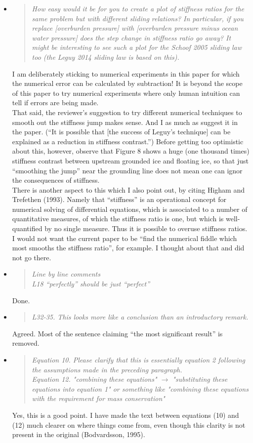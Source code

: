 \documentclass[11pt,reqno]{amsart}
\newcommand{\reply}[2]{
\medskip\medskip
\item  \begin{quote}
\emph{#1}
\end{quote}

\medskip
\noindent #2}
\begin{document}
\begin{itemize}
\reply{How easy would it be for you to create a plot of stiffness ratios for the same problem but with different sliding relations? In particular, if you replace [overburden pressure] with [overburden pressure minus ocean water pressure] does the step change in stiffness ratio go away? It might be interesting to see such a plot for the Schoof 2005 sliding law too (the Leguy 2014 sliding law is based on this).}
{I am deliberately sticking to numerical experiments in this paper for which the numerical error can be calculated by subtraction!  It is beyond the scope of this paper to try numerical experiments where only human intuition can tell if errors are being made. \medskip \\
That said, the reviewer's suggestion to try different numerical techniques to smooth out the stiffness jump makes sense.  And I as much as suggest it in the paper.  (``It is possible that [the success of Leguy's technique] can be explained as a reduction in stiffness contrast.'')  Before getting too optimistic about this, however, observe that Figure 8 shows a huge (one thousand times) stiffness contrast between upstream grounded ice and floating ice, so that just ``smoothing the jump'' near the grounding line does not mean one can ignor the consequences of stiffness. \medskip \\
There is another aspect to this which I also point out, by citing Higham and Trefethen (1993).  Namely that ``stiffness'' is an operational concept for numerical solving of differential equations, which is associated to a number of quantitative measures, of which the stiffness ratio is one, but which is well-quantified by no single measure.  Thus it is possible to overuse stiffness ratios.  I would not want the current paper to be ``find the numerical fiddle which most smooths the stiffness ratio'', for example.  I thought about that and did not go there.}

\reply{Line by line comments \smallskip \\
L18 ``perfectly'' should be just ``perfect''}
{Done.}

\reply{L32-35. This looks more like a conclusion than an introductory remark.}
{Agreed.  Most of the sentence claiming ``the most significant result'' is removed.}

\reply{Equation 10. Please clarify that this is essentially equation 2 following the assumptions made in the preceding paragraph. \smallskip \\
Equation 12. "combining these equations" $\to$ "substituting these equations into equation 1" or something like "combining these equations with the requirement for mass conservation"}
{Yes, this is a good point.  I have made the text between equations (10) and (12) much clearer on where things come from, even though this clarity is not present in the original (Bodvardsson, 1995).}


\end{itemize}
\end{document}
